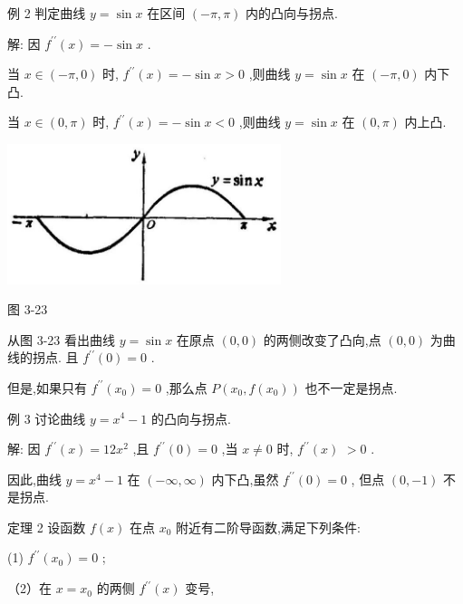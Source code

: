 \documentclass[lang=cn,newtx,10pt,scheme=chinese]{elegantbook}
\begin{document}
例 2 判定曲线 \(y = \sin x\) 在区间 \(\left( {-\pi ,\pi }\right)\) 内的凸向与拐点.

解: 因 \({f}^{\prime \prime }\left( x\right) = - \sin x\) .

当 \(x \in \left( {-\pi ,0}\right)\) 时, \({f}^{\prime \prime }\left( x\right) = - \sin x > 0\) ,则曲线 \(y = \sin x\) 在 \(\left( {-\pi ,0}\right)\) 内下凸.

当 \(x \in \left( {0,\pi }\right)\) 时, \({f}^{\prime \prime }\left( x\right) = - \sin x < 0\) ,则曲线 \(y = \sin x\) 在 \(\left( {0,\pi }\right)\) 内上凸.

\begin{center}
\includegraphics[max width=0.6\textwidth]{images/01912c18-5c3f-733d-b775-749ba9897a9d_169_891522.jpg}
\end{center}

图 3-23

从图 3-23 看出曲线 \(y = \sin x\) 在原点 \(\left( {0,0}\right)\) 的两侧改变了凸向,点 \(\left( {0,0}\right)\) 为曲线的拐点. 且 \({f}^{\prime \prime }\left( 0\right) = 0\) .

但是,如果只有 \({f}^{\prime \prime }\left( {x}_{0}\right) = 0\) ,那么点 \(P\left( {{x}_{0},f\left( {x}_{0}\right) }\right)\) 也不一定是拐点.

例 3 讨论曲线 \(y = {x}^{4} - 1\) 的凸向与拐点.

解: 因 \({f}^{\prime \prime }\left( x\right) = {12}{x}^{2}\) ,且 \({f}^{\prime \prime }\left( 0\right) = 0\) ,当 \(x \neq 0\) 时, \({f}^{\prime \prime }\left( x\right)\) \(> 0\) .

因此,曲线 \(y = {x}^{4} - 1\) 在 \(\left( {-\infty ,\infty }\right)\) 内下凸,虽然 \({f}^{\prime \prime }\left( 0\right) = 0\) , 但点 \(\left( {0, - 1}\right)\) 不是拐点.

定理 2 设函数 \(f\left( x\right)\) 在点 \({x}_{0}\) 附近有二阶导函数,满足下列条件:

(1) \({f}^{\prime \prime }\left( {x}_{0}\right) = 0\) ;

（2）在 \(x = {x}_{0}\) 的两侧 \({f}^{\prime \prime }\left( x\right)\) 变号,
\end{document}
